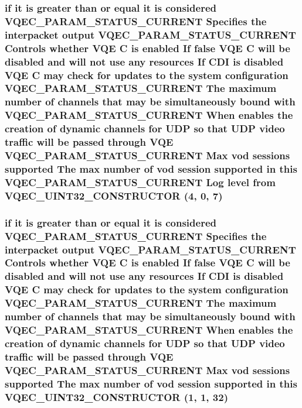 \subsubsection{\setlength{\rightskip}{0pt plus 5cm}if it is greater than or equal it is considered VQEC\_\-PARAM\_\-STATUS\_\-CURRENT Specifies the interpacket output VQEC\_\-PARAM\_\-STATUS\_\-CURRENT Controls whether VQE \bf{C} is enabled If false VQE \bf{C} will be disabled and will not use any resources If CDI is disabled VQE \bf{C} may check for updates \bf{to} the system configuration VQEC\_\-PARAM\_\-STATUS\_\-CURRENT The maximum number of \bf{channels} that may be simultaneously bound with VQEC\_\-PARAM\_\-STATUS\_\-CURRENT When enables the creation of dynamic \bf{channels} for UDP so that UDP video traffic will be passed through VQE VQEC\_\-PARAM\_\-STATUS\_\-CURRENT Max vod sessions supported The max number of vod session supported in \bf{this} VQEC\_\-PARAM\_\-STATUS\_\-CURRENT Log level from VQEC\_\-UINT32\_\-CONSTRUCTOR (4, 0, 7)}\label{vqec__cfg__settings_8h_e14518135d5e00b87260e9f55777ad06}


\subsubsection{\setlength{\rightskip}{0pt plus 5cm}if it is greater than or equal it is considered VQEC\_\-PARAM\_\-STATUS\_\-CURRENT Specifies the interpacket output VQEC\_\-PARAM\_\-STATUS\_\-CURRENT Controls whether VQE \bf{C} is enabled If false VQE \bf{C} will be disabled and will not use any resources If CDI is disabled VQE \bf{C} may check for updates \bf{to} the system configuration VQEC\_\-PARAM\_\-STATUS\_\-CURRENT The maximum number of \bf{channels} that may be simultaneously bound with VQEC\_\-PARAM\_\-STATUS\_\-CURRENT When enables the creation of dynamic \bf{channels} for UDP so that UDP video traffic will be passed through VQE VQEC\_\-PARAM\_\-STATUS\_\-CURRENT Max vod sessions supported The max number of vod session supported in \bf{this} VQEC\_\-UINT32\_\-CONSTRUCTOR (1, 1, 32)}\label{vqec__cfg__settings_8h_ee86459042b3662b6aa6d68a92e52cdd}


